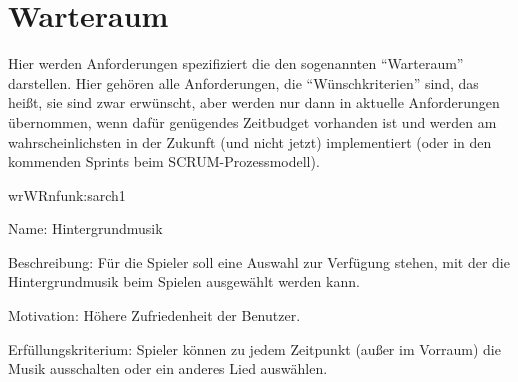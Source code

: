 \chapter{Warteraum}

Hier werden Anforderungen spezifiziert die den sogenannten ``Warteraum'' darstellen. Hier gehören alle Anforderungen, die ``Wünschkriterien'' sind, das heißt, sie sind zwar erwünscht, aber werden nur dann in aktuelle Anforderungen übernommen, wenn dafür genügendes Zeitbudget vorhanden ist und werden am wahrscheinlichsten in der Zukunft (und nicht jetzt) implementiert (oder in den kommenden Sprints beim SCRUM-Prozessmodell).

\setcounter{wr}{10}

\begin{description}[leftmargin=5em, style=sameline]	
	\begin{lhp}{wr}{WR}{nfunk:sarch1}
		\item [Name:] Hintergrundmusik
		\item [Beschreibung:] Für die Spieler soll eine Auswahl zur Verfügung stehen, mit der die Hintergrundmusik beim Spielen ausgewählt werden kann.
		\item [Motivation:] Höhere Zufriedenheit der Benutzer.
		\item [Erfüllungskriterium:] Spieler können zu jedem Zeitpunkt (außer im Vorraum) die Musik ausschalten oder ein anderes Lied auswählen.
	\end{lhp}
\end{description}